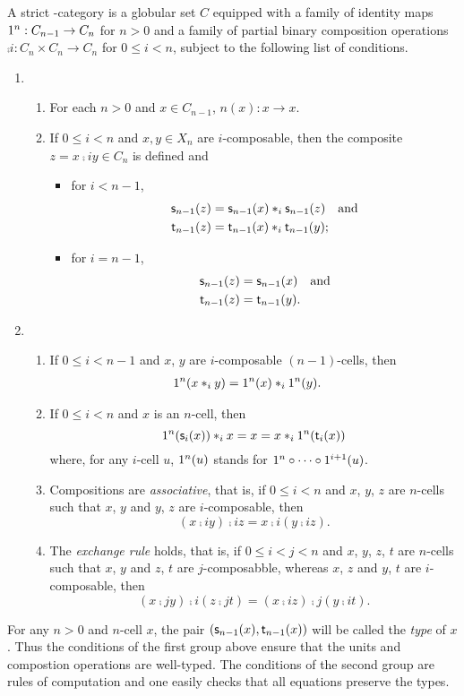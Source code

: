 A strict \oo-category  is a globular set $C$ equipped with a family of identity maps
$1^{n}:C_{n-1}\to C_n$ for $n>0$ and a family of partial binary composition operations  $\comp i:C_n\times C_n\to C_n$ for $0\leq i< n$, subject to the following list of conditions. 
\begin{enumerate}
\item
  \begin{enumerate}
  \item For each $n>0$ and $x\in C_{n-1}$, $\unit{n}(x): x\to x$.
  \item If $0\leq i<n$ and $x,y\in X_n$ are $i$-composable, then the composite $z=x\comp i y\in C_n$ is defined and
    \begin{itemize}
    \item for $i<n-1$,
      \begin{align*}
        \mathsf{s}_{n-1}(z) & =\mathsf{s}_{n-1}(x)\ast_{i}\mathsf{s}_{n-1}(z)\quad \hbox{and}\\
        \mathsf{t}_{n-1}(z) & =\mathsf{t}_{n-1}(x)\ast_{i}\mathsf{t}_{n-1}(y) ;
      \end{align*}
    \item  for $i=n-1$,
      \begin{align*}
        \mathsf{s}_{n-1}(z) & =\mathsf{s}_{n-1}(x) \quad \hbox{and}\\
         \mathsf{t}_{n-1}(z) & =\mathsf{t}_{n-1}(y).
      \end{align*}
    \end{itemize}
    \end{enumerate}
\item
  \begin{enumerate}
  \item If $0\leq i <n-1$ and $x$, $y$ are $i$-composable $(n{-}1)$-cells, then
    \begin{align*}
      1^{n}(x\ast_{i} y) & =1^{n}(x)\ast_{i} 1^{n}(y).
    \end{align*}
  \item If $0\leq i<n$ and $x$ is an $n$-cell, then
    \[1^{n}(\mathsf{s}_{i}(x))\ast_{i} x=x=x\ast_{i}1^{n}(\mathsf{t}_{i}(x))\]
    where, for any $i$-cell $u$, $1^{n}(u)$ stands for $1^{n}\circ\cdots\circ1^{i+1}(u)$.
  \item Compositions are {\em associative}, that is, if $0\leq i<n$ and $x$, $y$, $z$ are $n$-cells such that $x$, $y$ and $y$, $z$ are $i$-composable, then
    \[(x\comp i y)\comp i z=x\comp i (y\comp i z).\]
  \item The {\em exchange rule} holds, that is, if $0\leq i<j<n$ and $x$, $y$, $z$, $t$ are $n$-cells such that $x$, $y$ and $z$, $t$ are $j$-composabble, whereas $x$, $z$ and $y$, $t$ are $i$-composable, then
    \[(x\comp j y)\comp i (z\comp j t)= (x\comp i z)\comp j (y\comp i t).\]
  \end{enumerate}
\end{enumerate}
\begin{remark}
  For any $n>0$ and $n$-cell $x$, the pair $(\mathsf{s}_{n-1}(x),\mathsf{t}_{n-1}(x))$ will be called the {\em type} of $x$. Thus the conditions of the first group above ensure that the units and compostion operations are well-typed. The conditions of the second group are rules of computation and one easily checks that all equations preserve the types. 
\end{remark}
